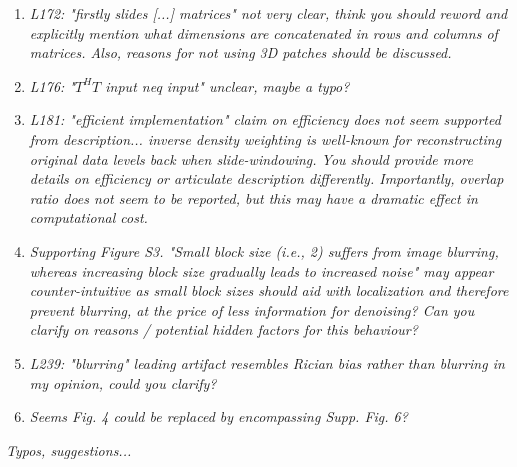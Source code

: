 \documentclass[a4paper,11pt,twoside]{report}
\begin{document}
\begin{enumerate}[resume]
    \item \textit{L172: "firstly slides [...] matrices" \textrightarrow not very clear, think you should reword and explicitly mention what dimensions are concatenated in rows and columns of matrices. Also, reasons for not using 3D patches should be discussed.}
    \item \textit{L176: "$T^HT$ input neq input" \textrightarrow unclear, maybe a typo?}
    \item \textit{L181: "efficient implementation" \textrightarrow claim on efficiency does not seem supported from description... inverse density weighting is well-known for reconstructing original data levels back when slide-windowing. You should provide more details on efficiency or articulate description differently. Importantly, overlap ratio does not seem to be reported, but this may have a dramatic effect in computational cost.}
    \item \textit{Supporting Figure S3. "Small block size (i.e., 2) suffers from image blurring, whereas increasing block size gradually leads to increased noise" \textrightarrow may appear counter-intuitive as small block sizes should aid with localization and therefore prevent blurring, at the price of less information for denoising? Can you clarify on reasons / potential hidden factors for this behaviour?}
    \item \textit{L239: "blurring" \textrightarrow leading artifact resembles Rician bias rather than blurring in my opinion, could you clarify?}
    \item \textit{Seems Fig. 4 could be replaced by encompassing Supp. Fig. 6?}
\end{enumerate}


\noindent \textit{Typos, suggestions...}
\end{document}
